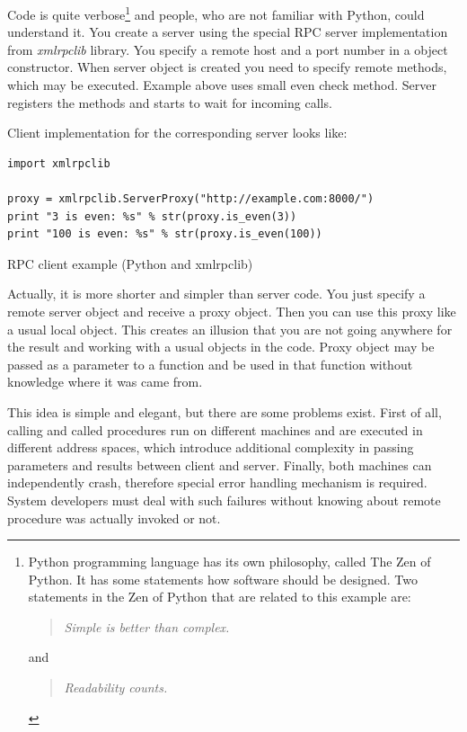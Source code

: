 Code is quite verbose\footnote{Python programming language has its own
philosophy, called The Zen of Python. It has some statements how software
should be designed. Two statements in the Zen of Python that are related to
this example are: \begin{quote}\textit{Simple is better than
complex.}\end{quote}  and \begin{quote}\textit{Readability counts.}\end{quote}}
and people, who are not familiar with Python, could understand it.
You create a server using the special RPC server implementation from
\textit{xmlrpclib} library. You specify a remote host and a port number in a
object constructor. When server object is created you need to specify remote
methods, which may be executed. Example above uses small even check method.
Server registers the methods and starts to wait for incoming calls.

Client implementation for the corresponding server looks like:
\begin{listing}[H]
\begin{verbatim}
import xmlrpclib

proxy = xmlrpclib.ServerProxy("http://example.com:8000/")
print "3 is even: %s" % str(proxy.is_even(3))
print "100 is even: %s" % str(proxy.is_even(100))
\end{verbatim}
\caption{RPC client example (Python and xmlrpclib)}
\label{lst:rpc_client_python_example}
\end{listing}

Actually, it is more shorter and simpler than server code. You just specify a
remote server object and receive a proxy object. Then you can use this proxy like a usual
local object. This creates an illusion that you are not going anywhere for the
result and working with a usual objects in the code. Proxy object may be passed
as a parameter to a function and be used in that function without knowledge
where it was came from.


This idea is simple and elegant, but there are some problems exist. First of
all, calling and called procedures run on different machines and are executed in
different address spaces, which introduce additional complexity in passing
parameters and results between client and server.
Finally, both machines can independently crash, therefore special error
handling mechanism is required. System developers must deal with such failures
without knowing about remote procedure was actually invoked or not.

